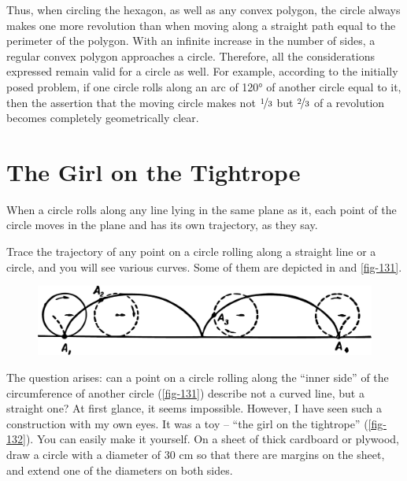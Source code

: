 Thus, when circling the hexagon, as well as any convex polygon, the circle always makes one more revolution than when moving along a straight path equal to the perimeter of the polygon. With an infinite increase in the number of sides, a regular convex polygon approaches a circle. Therefore, all the considerations expressed remain valid for a circle as well. For example, according to the initially posed problem, if one circle rolls along an arc of \ang{120} of another circle equal to it, then the assertion that the moving circle makes not $\nicefrac{1}{3}$ but $\nicefrac{2}{3}$ of a revolution becomes completely geometrically clear.


\section{The Girl on the Tightrope}
\label{sec-9.11}


When a circle rolls along any line lying in the same plane as it, each point of the circle moves in the plane and has its own trajectory, as they say.

Trace the trajectory of any point on a circle rolling along a straight line or a circle, and you will see various curves. Some of them are depicted in  and \ref{fig-131}.

\begin{figure}[h!]
\centering
\includegraphics[width=\textwidth]{figures/ch-09/fig-130.pdf}
\end{figure}


The question arises: can a point on a circle rolling along the ``inner side'' of the circumference of another circle (\ref{fig-131}) describe not a curved line, but a straight one? At first glance, it seems impossible. However, I have seen such a construction with my own eyes. It was a toy -- ``the girl on the tightrope'' (\ref{fig-132}). You can easily make it yourself. On a sheet of thick cardboard or plywood, draw a circle with a diameter of 30 cm so that there are margins on the sheet, and extend one of the diameters on both sides.

